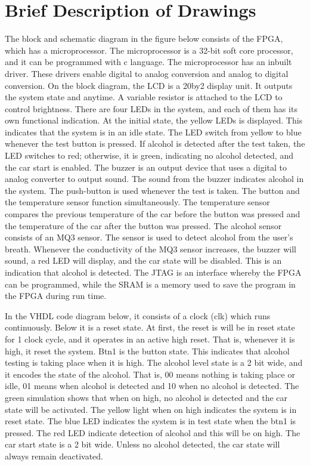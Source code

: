 \documentclass[12pt]{article}
\begin{document}
\section{Brief Description of Drawings}
The block and schematic diagram in the figure below consists of the FPGA, which has a microprocessor. The microprocessor is a 32-bit soft core processor, and it can be programmed with c language. The microprocessor has an inbuilt driver. These drivers enable digital to analog conversion and analog to digital conversion. On the block diagram, the LCD is a 20by2 display unit. It outputs the system state and anytime. A variable resistor is attached to the LCD to control brightness.
There are four LEDs in the system, and each of them has its own functional indication. At the initial state, the yellow LEDs is displayed. This indicates that the system is in an idle state. The LED switch from yellow to blue whenever the test button is pressed. If alcohol is detected after the test taken, the LED switches to red; otherwise, it is green, indicating no alcohol detected, and the car start is enabled. The buzzer is an output device that uses a digital to analog converter to output sound. The sound from the buzzer indicates alcohol in the system. The push-button is used whenever the test is taken. The button and the temperature sensor function simultaneously. The temperature sensor compares the previous temperature of the car before the button was pressed and the temperature of the car after the button was pressed. The alcohol sensor consists of an MQ3 sensor. The sensor is used to detect alcohol from the user's breath. Whenever the conductivity of the MQ3 sensor increases, the buzzer will sound, a red LED will display, and the car state will be disabled. This is an indication that alcohol is detected. The JTAG is an interface whereby the FPGA can be programmed, while the SRAM is a memory used to save the program in the FPGA during run time.

In the VHDL code diagram below, it consists of a clock (clk) which runs continuously. Below it is a reset state. At first, the reset is will be in reset state for 1 clock cycle, and it operates in an active high reset. That is, whenever it is high, it reset the system. Btn1 is the button state. This indicates that alcohol testing is taking place when it is high. The alcohol level state is a 2 bit wide, and it encodes the state of the alcohol. That is, 00 means nothing is taking place or idle, 01 means when alcohol is detected and 10 when no alcohol is detected. The green simulation shows that when on high, no alcohol is detected and the car state will be activated. The yellow light when on high indicates the system is in reset state. The blue LED indicates the system is in test state when the btn1 is pressed. The red LED indicate detection of alcohol and this will be on high. The car start state is a 2 bit wide. Unless no alcohol detected, the car state will always remain deactivated.
\end{document}
